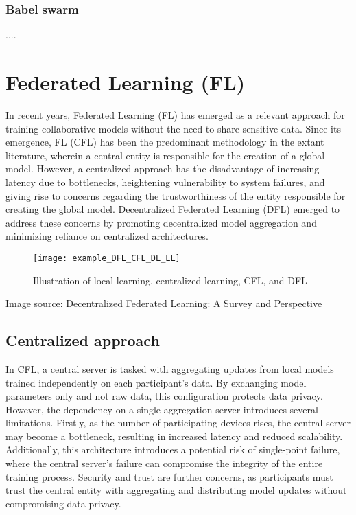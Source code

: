 \subsubsection{Babel swarm}
\label{sec:babel_swarm}

....


\section{Federated Learning (FL)}
\label{sec:federated_laerning}

In recent years, Federated Learning (FL) has emerged as a relevant approach for training collaborative models without the need to share sensitive data. Since its emergence, \gls{FL} (\gls{CFL}) has been the predominant methodology in the extant literature, wherein a central entity is responsible for the creation of a global model. However, a centralized approach has the disadvantage of increasing latency due to bottlenecks, heightening vulnerability to system failures, and giving rise to concerns regarding the trustworthiness of the entity responsible for creating the global model. Decentralized Federated Learning (DFL) emerged to address these concerns by promoting decentralized model aggregation and minimizing reliance on centralized architectures.

\begin{figure}[H]
  \centering
  \texttt{[image: example\_DFL\_CFL\_DL\_LL]}
  \caption{Illustration of local learning, centralized learning, CFL, and DFL}
  \label{fig:DFL_CFL_DL_LL}
\end{figure}

Image source: Decentralized Federated Learning: A Survey and Perspective

\subsection{Centralized approach}
\label{sub:fl_centralized_approach}

In \gls{CFL}, a central server is tasked with aggregating updates from local models trained independently on each participant’s data. By exchanging model parameters only and not raw data, this configuration protects data privacy. However, the dependency on a single aggregation server introduces several limitations. Firstly, as the number of participating devices rises, the central server may become a bottleneck, resulting in increased latency and reduced scalability. Additionally, this architecture introduces a potential risk of single-point failure, where the central server’s failure can compromise the integrity of the entire training process. Security and trust are further concerns, as participants must trust the central entity with aggregating and distributing model updates without compromising data privacy.

